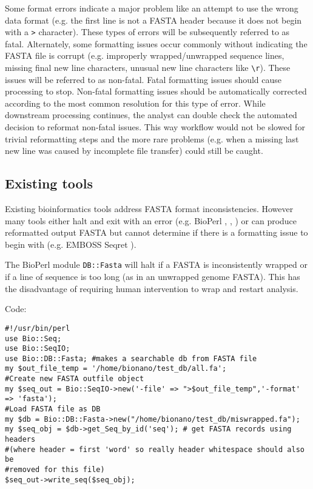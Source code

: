 \documentclass{bmcart}
\begin{document}
Some format errors indicate a major problem like an attempt to use the wrong data format (e.g. the first line is not a FASTA header because it does not begin with a \verb|>| character). These types of errors will be subsequently referred to as fatal. Alternately, some formatting issues occur commonly without indicating the FASTA file is corrupt (e.g. improperly wrapped/unwrapped sequence lines, missing final new line characters, unusual new line characters like \verb|\r|). These issues will be referred to as non-fatal. Fatal formatting issues should cause processing to stop. Non-fatal formatting issues should be automatically corrected according to the most common resolution for this type of error. While downstream processing continues, the analyst can double check the automated decision to reformat non-fatal issues. This way workflow would not be slowed for trivial reformatting steps and the more rare problems (e.g. when a missing last new line was caused by incomplete file transfer) could still be caught.
  
\subsection{Existing tools}

Existing bioinformatics tools address FASTA format inconsistencies. However many tools either halt and exit with an error (e.g. BioPerl \cite{bioperl}, \cite{bioperl2}, \cite{bioperl3}) or can produce reformatted output FASTA but cannot determine if there is a formatting issue to begin with (e.g. EMBOSS Seqret \cite{PMID:10827456}). 

The BioPerl module \verb|DB::Fasta| will halt if a FASTA is inconsistently wrapped or if a line of sequence is too long (as in an unwrapped genome FASTA). This has the disadvantage of requiring human intervention to wrap and restart analysis.

Code:
\begin{verbatim}
#!/usr/bin/perl
use Bio::Seq;
use Bio::SeqIO;
use Bio::DB::Fasta; #makes a searchable db from FASTA file
my $out_file_temp = '/home/bionano/test_db/all.fa';
#Create new FASTA outfile object
my $seq_out = Bio::SeqIO->new('-file' => ">$out_file_temp",'-format' => 'fasta');
#Load FASTA file as DB
my $db = Bio::DB::Fasta->new("/home/bionano/test_db/miswrapped.fa");
my $seq_obj = $db->get_Seq_by_id('seq'); # get FASTA records using headers 
#(where header = first 'word' so really header whitespace should also be 
#removed for this file)
$seq_out->write_seq($seq_obj);
\end{verbatim}
\end{document}
